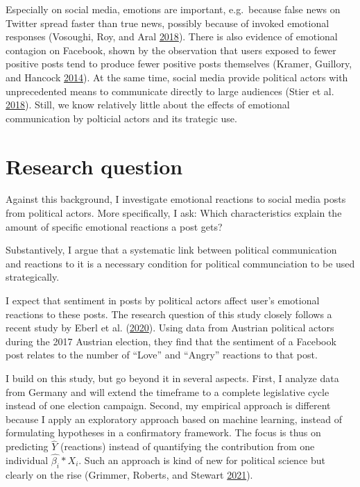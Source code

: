 \documentclass[
  12pt,
]{article}
\begin{document}
Especially on social media, emotions are important, e.g.~because false news on Twitter spread faster than true news, possibly because of invoked emotional responses (Vosoughi, Roy, and Aral \protect\hyperlink{ref-vosoughi2018spread}{2018}). There is also evidence of emotional contagion on Facebook, shown by the observation that users exposed to fewer positive posts tend to produce fewer positive posts themselves (Kramer, Guillory, and Hancock \protect\hyperlink{ref-kramer2014experimental}{2014}). At the same time, social media provide political actors with unprecedented means to communicate directly to large audiences (Stier et al. \protect\hyperlink{ref-stier2018election}{2018}). Still, we know relatively little about the effects of emotional communication by polticial actors and its trategic use.

\hypertarget{research-question}{%
\section{Research question}\label{research-question}}

Against this background, I investigate emotional reactions to social media posts from political actors. More specifically, I ask: Which characteristics explain the amount of specific emotional reactions a post gets?

Substantively, I argue that a systematic link between political communication and reactions to it is a necessary condition for political communciation to be used strategically.

I expect that sentiment in posts by political actors affect user's emotional reactions to these posts. The research question of this study closely follows a recent study by Eberl et al. (\protect\hyperlink{ref-eberl2020what}{2020}). Using data from Austrian political actors during the 2017 Austrian election, they find that the sentiment of a Facebook post relates to the number of ``Love'' and ``Angry'' reactions to that post.

I build on this study, but go beyond it in several aspects. First, I analyze data from Germany and will extend the timeframe to a complete legislative cycle instead of one election campaign. Second, my empirical approach is different because I apply an exploratory approach based on machine learning, instead of formulating hypotheses in a confirmatory framework. The focus is thus on predicting \(\hat{Y}\) (reactions) instead of quantifying the contribution from one individual \(\hat{\beta_i}*X_i\). Such an approach is kind of new for political science but clearly on the rise (Grimmer, Roberts, and Stewart \protect\hyperlink{ref-grimmer2021machine}{2021}).
\end{document}
